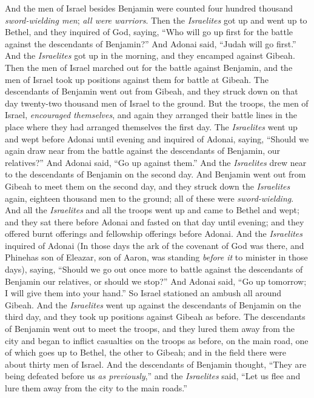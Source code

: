 \begin{biblechapter}
\verse And the men of Israel besides Benjamin were counted four hundred thousand \textit{sword-wielding men}; \textit{all were warriors}.
\verse Then the \textit{Israelites} got up and went up to Bethel, and they inquired of God, saying, “Who will go up first for the battle against the descendants of Benjamin?” And Adonai said, “Judah will go first.”
\verse And the \textit{Israelites} got up in the morning, and they encamped against Gibeah.
\verse Then the men of Israel marched out for the battle against Benjamin, and the men of Israel took up positions against them for battle at Gibeah.
\verse The descendants of Benjamin went out from Gibeah, and they struck down on that day twenty-two thousand men of Israel to the ground.
\verse But the troops, the men of Israel, \textit{encouraged themselves}, and again they arranged their battle lines in the place where they had arranged themselves the first day.
\verse The \textit{Israelites} went up and wept before Adonai until evening and inquired of Adonai, saying, “Should we again draw near from the battle against the descendants of Benjamin, our relatives?” And Adonai said, “Go up against them.”
\verse And the \textit{Israelites} drew near to the descendants of Benjamin on the second day.
\verse And Benjamin went out from Gibeah to meet them on the second day, and they struck down the \textit{Israelites} again, eighteen thousand men to the ground; all of these were \textit{sword-wielding}.
\verse And all the \textit{Israelites} and all the troops went up and came to Bethel and wept; and they sat there before Adonai and fasted on that day until evening; and they offered burnt offerings and fellowship offerings before Adonai.
\verse And the \textit{Israelites} inquired of Adonai (In those days the ark of the covenant of God was there,
\verse and Phinehas son of Eleazar, son of Aaron, was standing \textit{before it} to minister in those days), saying, “Should we go out once more to battle against the descendants of Benjamin our relatives, or should we stop?” And Adonai said, “Go up tomorrow; I will give them into your hand.”
\verse So Israel stationed an ambush all around Gibeah.
\verse And the \textit{Israelites} went up against the descendants of Benjamin on the third day, and they took up positions against Gibeah as before.
\verse The descendants of Benjamin went out to meet the troops, and they lured them away from the city and began to inflict casualties on the troops as before, on the main road, one of which goes up to Bethel, the other to Gibeah; and in the field there were about thirty men of Israel.
\verse And the descendants of Benjamin thought, “They are being defeated before us \textit{as previously},” and the \textit{Israelites} said, “Let us flee and lure them away from the city to the main roads.”

\end{biblechapter}

